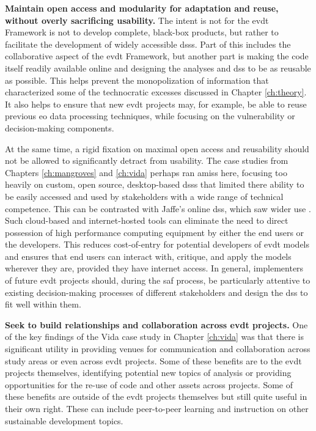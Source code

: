 \textbf{Maintain open access and modularity for adaptation and reuse, without overly sacrificing usability.} The intent is not for the \ac{evdt} Framework is not to develop complete, black-box products, but rather to facilitate the development of widely accessible \acp{dss}. Part of this includes the collaborative aspect of the \ac{evdt} Framework, but another part is making the code itself readily available online and designing the analyses and \ac{dss} to be as reusable as possible. This helps prevent the monopolization of information that characterized some of the technocratic excesses discussed in Chapter \ref{ch:theory}. It also helps to ensure that new \ac{evdt} projects may, for example, be able to reuse previous \ac{eo} data processing techniques, while focusing on the vulnerability or decision-making components.

At the same time, a rigid fixation on maximal open access and reusability should not be allowed to significantly detract from usability. The case studies from Chapters \ref{ch:mangroves} and \ref{ch:vida} perhaps ran amiss here, focusing too heavily on custom, open source, desktop-based \acp{dss} that limited there ability to be easily accessed and used by stakeholders with a wide range of technical competence. This can be contrasted with Jaffe's online \ac{dss}, which saw wider use \cite{jaffeEnvironmentalEconomicSystems2022}. Such cloud-based and internet-hosted tools can eliminate the need to direct possession of high performance computing equipment by either the end users or the developers. This reduces cost-of-entry for potential developers of \ac{evdt} models and ensures that end users can interact with, critique, and apply the models wherever they are, provided they have internet access. In general, implementers of future \ac{evdt} projects should, during the \ac{saf} process, be particularly attentive to existing decision-making processes of different stakeholders and design the \ac{dss} to fit well within them.

\textbf{Seek to build relationships and collaboration across \ac{evdt} projects.} One of the key findings of the Vida case study in Chapter \ref{ch:vida} was that there is significant utility in providing venues for communication and collaboration across study areas or even across \ac{evdt} projects. Some of these benefits are to the \ac{evdt} projects themselves, identifying potential new topics of analysis or providing opportunities for the re-use of code and other assets across projects. Some of these benefits are outside of the \ac{evdt} projects themselves but still quite useful in their own right. These can include peer-to-peer learning and instruction on other sustainable development topics.
 

